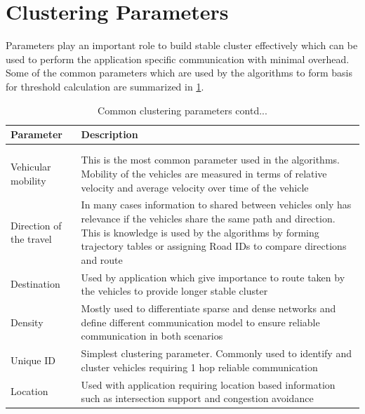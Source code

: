 \documentclass[]{ccs-thesis}
\begin{document}
\section{Clustering Parameters}

Parameters play an important role to build stable cluster effectively which can be used to perform the application
specific communication with minimal overhead. Some of the common parameters which are used by the algorithms to
form basis for threshold calculation are summarized in \cref{tab:parameters}.

\begin{longtable}{>{\raggedright}p{3.5cm}p{7.5cm}}
        \hline
        Parameter               & Description                                                   \\
        \hline
        \endhead
        \hline
        \caption{Common clustering parameters}\label{tab:parameters}\\
        \endfoot
        \hline
        \caption{Common clustering parameters contd...}\\
        \endlastfoot
        Vehicular mobility      & This is the most common parameter used in the algorithms. Mobility of the vehicles are measured in terms of
                                relative velocity and average velocity over time of the vehicle \\
        Direction of the travel & In many cases information to shared between vehicles only has relevance if the vehicles share the same path
                                and direction. This is knowledge is used by the algorithms by forming trajectory tables or assigning Road IDs
                                to compare directions and route                                 \\
        Destination             & Used by application which give importance to route taken by the vehicles to provide longer stable cluster \\
        Density                 & Mostly used to differentiate sparse and dense networks and define different communication model to ensure reliable
                                communication in both scenarios                                               \\
        Unique ID               & Simplest clustering parameter. Commonly used to identify and cluster vehicles requiring 1 hop reliable communication \\
        Location                & Used with application requiring location based information such as intersection support and congestion avoidance \\
\end{longtable}
\end{document}
